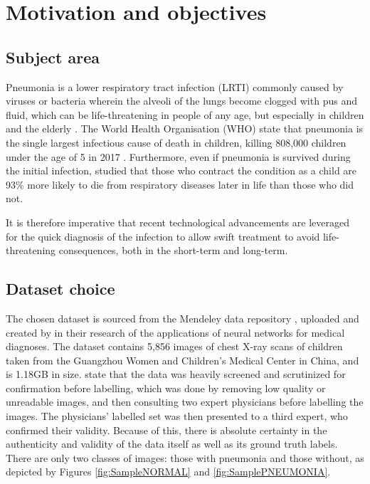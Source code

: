 \documentclass[12pt]{report}
\newcommand{\para}{\vspace{7pt}\noindent}
\begin{document}


\chapter{Motivation and objectives}

\section{Subject area}

Pneumonia is a lower respiratory tract infection (LRTI) commonly caused by viruses or bacteria wherein the alveoli of the lungs 
become clogged with pus and fluid, which can be life-threatening in people of any age, but especially in children and the elderly
\autocite{nhsPneumonia2017}. The World Health Organisation (WHO) state that pneumonia is the single largest infectious cause of death 
in children, killing 808,000 children under the age of 5 in 2017 \autocite{whoPneumonia}. Furthermore, even if pneumonia is survived during the initial 
infection, \textcite{allinsonEarlyChildhoodLower2023} studied that those who contract the condition as a child are 93\% more likely to die from 
respiratory diseases later in life than those who did not.

\para It is therefore imperative that recent technological advancements are leveraged for the quick diagnosis of the infection to allow swift 
treatment to avoid life-threatening consequences, both in the short-term and long-term. 

\section{Dataset choice}
The chosen dataset is sourced from the Mendeley data repository \autocite{mendeleydataLargeDatasetLabeled}, uploaded and created by  
\textcite[p.1127]{kermanyIdentifyingMedicalDiagnoses2018} in their research of the applications of neural networks for medical diagnoses.
The dataset contains 5,856 images of chest X-ray scans of children taken from the
Guangzhou Women and Children's Medical Center in China, and is 1.18GB in size. \textcite[p.e1]{kermanyIdentifyingMedicalDiagnoses2018} 
state that the data was heavily screened and scrutinized for confirmation before labelling, which was done by removing low quality or unreadable images,
and then consulting two expert physicians before labelling the images. The physicians' labelled set was then presented to a third expert, 
who confirmed their validity. Because of this, there is absolute certainty in the authenticity and validity of the data itself as well as its 
ground truth labels.
There are only two classes of images: those with 
pneumonia and those without, as depicted by Figures \ref{fig:SampleNORMAL} and \ref{fig:SamplePNEUMONIA}.
\end{document}
